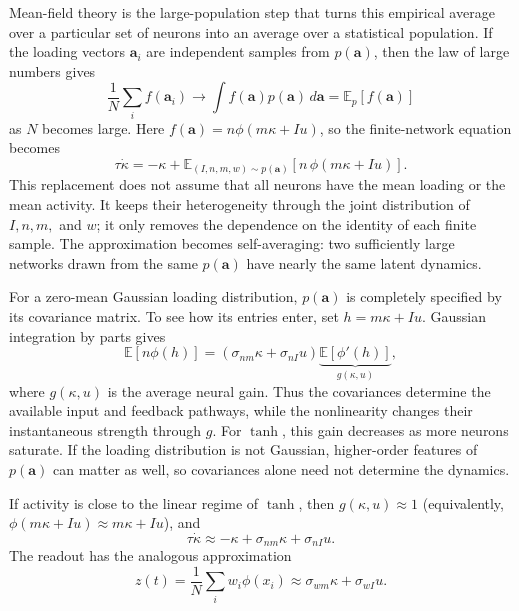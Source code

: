 \documentclass[11pt]{article}
\begin{document}
Mean-field theory is the large-population step that turns this empirical average
over a particular set of neurons into an average over a statistical population.
If the loading vectors $\mathbf{a}_i$ are independent samples from
$p(\mathbf{a})$, then the law of large numbers gives
\[
  \frac{1}{N}\sum_i f(\mathbf{a}_i)
  \longrightarrow
  \int f(\mathbf{a})p(\mathbf{a})\,d\mathbf{a}
  =
  \mathbb{E}_{p}[f(\mathbf{a})]
\]
as $N$ becomes large. Here
$f(\mathbf{a})=n\phi(m\kappa+Iu)$, so the finite-network equation becomes
\begin{equation}
  \tau \dot{\kappa}
  =
  -\kappa
  +
  \mathbb{E}_{(I,n,m,w)\sim p(\mathbf{a})}
  \left[
    n\,\phi(m\kappa + Iu)
  \right].
  \label{eq:rank_one_mean_field_expectation}
\end{equation}
This replacement does not assume that all neurons have the mean loading or the
mean activity. It keeps their heterogeneity through the joint distribution of
$I,n,m,$ and $w$; it only removes the dependence on the identity of each finite
sample. The approximation becomes self-averaging: two sufficiently large
networks drawn from the same $p(\mathbf{a})$ have nearly the same latent
dynamics.

For a zero-mean Gaussian loading distribution, $p(\mathbf{a})$ is completely
specified by its covariance matrix. To see how its entries enter, set
$h=m\kappa+Iu$. Gaussian integration by parts gives
\begin{equation}
  \mathbb{E}\!\left[n\phi(h)\right]
  =
  \left(\sigma_{nm}\kappa+\sigma_{nI}u\right)
  \underbrace{\mathbb{E}\!\left[\phi'(h)\right]}_{g(\kappa,u)},
  \label{eq:rank_one_gaussian_mean_field}
\end{equation}
where $g(\kappa,u)$ is the average neural gain. Thus the covariances determine
the available input and feedback pathways, while the nonlinearity changes their
instantaneous strength through $g$. For $\tanh$, this gain decreases as more
neurons saturate. If the loading distribution is not Gaussian, higher-order
features of $p(\mathbf{a})$ can matter as well, so covariances alone need not
determine the dynamics.

If activity is close to the linear regime of $\tanh$, then
$g(\kappa,u)\approx 1$ (equivalently,
$\phi(m\kappa + Iu) \approx m\kappa + Iu$), and
\begin{equation}
  \tau \dot{\kappa}
  \approx
  -\kappa
  +
  \sigma_{nm}\kappa
  +
  \sigma_{nI}u.
  \label{eq:rank_one_linear_covariance}
\end{equation}
The readout has the analogous approximation
\begin{equation}
  z(t)
  =
  \frac{1}{N}\sum_i w_i\phi(x_i)
  \approx
  \sigma_{wm}\kappa + \sigma_{wI}u.
  \label{eq:rank_one_readout_covariance}
\end{equation}
\end{document}

